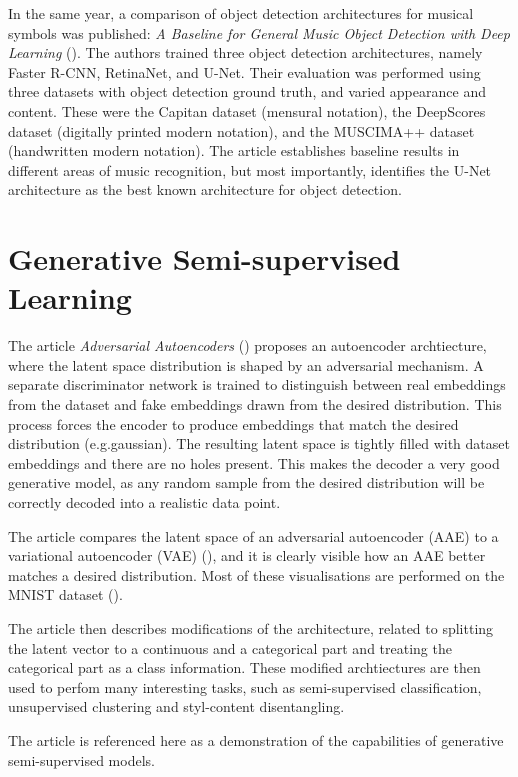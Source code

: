 In the same year, a comparison of object detection architectures for musical symbols was published: \emph{A Baseline for General Music Object Detection with Deep Learning} (\cite{PachaBaseline}). The authors trained three object detection architectures, namely Faster R-CNN, RetinaNet, and U-Net. Their evaluation was performed using three datasets with object detection ground truth, and varied appearance and content. These were the Capitan dataset (mensural notation), the DeepScores dataset (digitally printed modern notation), and the MUSCIMA++ dataset (handwritten modern notation). The article establishes baseline results in different areas of music recognition, but most importantly, identifies the U-Net architecture as the best known architecture for object detection.


\section{Generative Semi-supervised Learning}

The article \emph{Adversarial Autoencoders} (\cite{AdversarialAutoencoders}) proposes an autoencoder archtiecture, where the latent space distribution is shaped by an adversarial mechanism. A separate discriminator network is trained to distinguish between real embeddings from the dataset and fake embeddings drawn from the desired distribution. This process forces the encoder to produce embeddings that match the desired distribution (e.g.\@ gaussian). The resulting latent space is tightly filled with dataset embeddings and there are no holes present. This makes the decoder a very good generative model, as any random sample from the desired distribution will be correctly decoded into a realistic data point.

The article compares the latent space of an adversarial autoencoder (AAE) to a variational autoencoder (VAE) (\cite{VariationalAutoencoder}), and it is clearly visible how an AAE better matches a desired distribution. Most of these visualisations are performed on the MNIST dataset (\cite{Mnist}).

The article then describes modifications of the architecture, related to splitting the latent vector to a continuous and a categorical part and treating the categorical part as a class information. These modified archtiectures are then used to perfom many interesting tasks, such as semi-supervised classification, unsupervised clustering and styl-content disentangling.

The article is referenced here as a demonstration of the capabilities of generative semi-supervised models.

